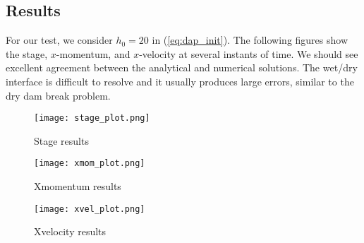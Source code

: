 \subsection{Results}

For our test, we consider $h_0=20$ in (\ref{eq:dap_init}).
The following figures show the stage, $x$-momentum, and $x$-velocity at several instants of time. We should see excellent agreement between the analytical and numerical solutions. The wet/dry interface is difficult to resolve and it usually produces large errors, similar to the dry dam break problem.
\begin{figure}
\begin{center}
\texttt{[image: stage\_plot.png]}
\end{center}
\caption{Stage results}
\end{figure}


\begin{figure}
\begin{center}
\texttt{[image: xmom\_plot.png]}
\end{center}
\caption{Xmomentum results}
\end{figure}


\begin{figure}
\begin{center}
\texttt{[image: xvel\_plot.png]}
\end{center}
\caption{Xvelocity results}
\end{figure}


\endinput
